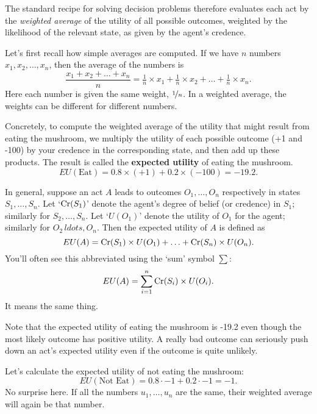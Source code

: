 The standard recipe for solving decision problems therefore evaluates
each act by the \emph{weighted average} of the utility of all possible
outcomes, weighted by the likelihood of the relevant state, as given
by the agent's credence.

Let's first recall how simple averages are computed. If we have $n$
numbers $x_1, x_2, \ldots, x_n$, then the average of the numbers is
\[
\frac{x_1 + x_2 + \ldots + x_n}{n} = \tfrac{1}{n}\times x_1 + \tfrac{1}{n}\times x_2 + \ldots + \tfrac{1}{n}\times x_n.
\]
Here each number is given the same weight, $\nicefrac{1}{n}$. In a
weighted average, the weights can be different for different numbers.

Concretely, to compute the weighted average of the utility that might
result  from eating the mushroom, we multiply the utility of each
possible outcome (+1 and -100) by your credence in the corresponding
state, and then add up these products. The result is called the
\textbf{expected utility} of eating the mushroom.
\[
EU(\text{Eat}) = 0.8 \times (+1) + 0.2 \times (-100) = -19.2.
\]

In general, suppose an act $A$ leads to outcomes $O_1,\ldots,O_n$
respectively in states $S_1,\ldots, S_n$. Let `$\text{Cr}(S_1)$' denote the
agent's degree of belief (or credence) in $S_1$; similarly for
$S_2,\ldots,S_n$. Let `$U(O_1)$' denote the utility of $O_1$ for the
agent; similarly for $O_2\,ldots,O_n$. Then the expected utility of
$A$ is defined as
\[
EU(A) = \text{Cr}(S_1) \times U(O_1) + \ldots + \text{Cr}(S_n) \times U(O_n).
\]
You'll often see this abbreviated using the `sum' symbol $\sum$:
\[
EU(A) = \sum_{i=1}^n \text{Cr}(S_i) \times U(O_i).
\]
It means the same thing.



Note that the expected utility of eating the mushroom is -19.2 even
though the most likely outcome has positive utility. A really bad
outcome can seriously push down an act's expected utility even if the
outcome is quite unlikely. 

Let's calculate the expected utility of not eating the mushroom:
\[
EU(\text{Not Eat}) = 0.8 \cdot -1 + 0.2 \cdot -1 = -1.
\]
No surprise here. If all the numbers $u_1,\ldots,u_n$ are the same,
their weighted average will again be that number.

